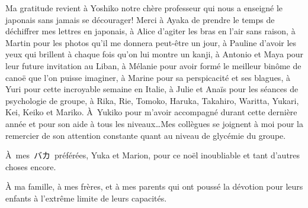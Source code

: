 Ma gratitude revient à Yoshiko notre chère professeur qui nous a
enseigné le japonais sans jamais se décourager! Merci à Ayaka de
prendre le temps de déchiffrer mes lettres en japonais, à Alice
d'agiter les bras en l'air sans raison, à Martin pour les photos qu'il
me donnera peut-être un jour, à Pauline d'avoir les yeux qui brillent
à chaque fois qu'on lui montre un kanji, à Antonio et Maya pour leur
future invitation au Liban, à Mélanie pour avoir formé le meilleur
binôme de canoë que l'on puisse imaginer, à Marine pour sa
perspicacité et ses blagues, à Yuri pour cette incroyable semaine en
Italie, à Julie et Anaïs pour les séances de psychologie de groupe, à
Rika, Rie, Tomoko, Haruka, Takahiro, Waritta, Yukari, Kei, Keiko et
Mariko. À~Yukiko pour m'avoir accompagné durant cette dernière année
et pour son aide à tous les niveaux\ldots Mes collègues se joignent à
moi pour la remercier de son attention constante quant au niveau de
glycémie du groupe.


\begin{CJK*}{UTF8}{min}%
À~mes~バカ~préférées, Yuka et Marion, pour ce noël inoubliable et tant
d'autres choses encore.
\end{CJK*}



À ma famille, à mes frères, et à mes parents qui ont poussé la
dévotion pour leurs enfants à l'extrême limite de leurs capacités.
